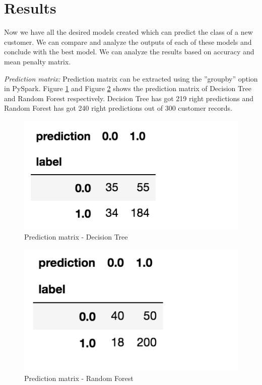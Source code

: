 \documentclass[sigconf]{acmart}
\begin{document}
\section{Results}

Now we have all the desired models created which can predict the class of a new customer. We can compare and analyze the outputs of each of these models and conclude with the best model. We can analyze the results based on accuracy and mean penalty matrix.

\textit{Prediction matrix:} Prediction matrix can be extracted using the ''groupby'' option in PySpark. Figure \ref{fig:Figure22} and Figure \ref{fig:Figure23} shows the prediction matrix of Decision Tree and Random Forest respectively. Decision Tree has got 219 right predictions and Random Forest has got 240 right predictions out of 300 customer records.

\begin{figure}[htb]
  \centering
  \includegraphics[width=1.0\columnwidth]{images/Figure22.png}
  \caption{Prediction matrix - Decision Tree}
  \label{fig:Figure22} 
\end{figure}

\begin{figure}[htb]
  \centering
  \includegraphics[width=1.0\columnwidth]{images/Figure23.png}
  \caption{Prediction matrix - Random Forest}
  \label{fig:Figure23} 
\end{figure}
\end{document}
